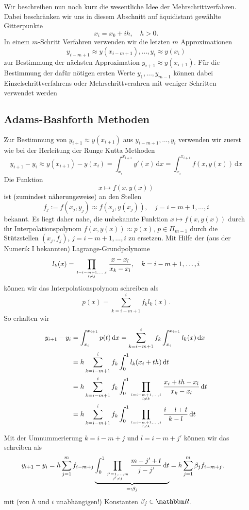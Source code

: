 \documentclass[12pt,a4paper]{book}
\theoremstyle{break}
\theoremstyle{nonumberplain}
\newcommand{\R}{\mathbbm R}
\newcommand{\1}{\mathbbm{1}} 			      	%
\newcommand{\dx}[1][x]{\ensuremath{\, \mathrm{d} #1}} 	%
\begin{document}
Wir beschreiben nun noch kurz die wesentliche Idee der Mehrschrittverfahren. 
Dabei beschränken wir uns in diesem Abschnitt auf äquidistant gewählte Gitterpunkte 
\[
x_i=x_0+ih, \quad h>0. 
\]
In einem $m$-Schritt Verfahren verwenden wir die letzten $m$ Approximationen
\[
y_{i-m+1}\approx y(x_{i-m+1}),\ldots, y_{i}\approx y(x_{i})
\]
zur Bestimmung der nächsten Approximation $y_{i+1}\approx y(x_{i+1})$.
Für die Bestimmung der dafür nötigen ersten Werte $y_1,\ldots, y_{m-1}$ 
können dabei Einzelschrittverfahrens oder Mehrschrittverahren mit weniger Schritten 
verwendet werden

\subsection{Adams-Bashforth Methoden}\label{subsect:adam_bashforth}
Zur Bestimmung von $y_{i+1}\approx y(x_{i+1})$ aus $y_{i-m+1},\ldots,y_i$ 
verwenden wir zuerst wie bei der
Herleitung der Runge Kutta Methoden
\[
y_{i+1}-y_i\approx y(x_{i+1})-y(x_i)=\int_{x_i}^{x_{i+1}} y'(x) \dx
=\int_{x_i}^{x_{i+1}} f(x,y(x)) \dx[x]
\]
Die Funktion 
\[
x\mapsto f(x,y(x))
\]
ist (zumindest näherungsweise) an den Stellen 
\[
f_j:=f(x_j,y_j)\approx f(x_j,y(x_j)), \quad j=i-m+1,\ldots,i
\]
bekannt. Es liegt daher nahe, die unbekannte Funktion $x\mapsto f(x,y(x))$ durch ihr 
Interpolationspolynom $f(x,y(x))\approx p(x)$, $p\in \Pi_{m-1}$ durch die Stützstellen $(x_j,f_j)$, $j=i-m+1,\ldots,i$ zu ersetzen. 
Mit Hilfe der (aus der Numerik I bekannten) Lagrange-Grundpo\-ly\-no\-me
\[
l_k(x)=\prod_{l=i-m+1,\dots,i \atop l\neq j} \frac{x-x_l}{x_k-x_l}, \quad k=i-m+1,\ldots,i
\]
können wir das Interpolationspolynom schreiben als
\[
p(x)=\sum_{k=i-m+1}^i f_k l_k(x).
\]
So erhalten wir
\begin{align*}
y_{i+1}-y_i&= \int_{x_{i}}^{x_{i+1}} p(t) \dx
=\sum_{k=i-m+1}^i f_k \int_{x_{i}}^{x_{i+1}} l_k(x)\dx\\
&=h \sum_{k=i-m+1}^i f_k \int_0^1 l_k(x_i+th)\dx[t]\\
&= h \sum_{k=i-m+1}^i f_k \int_0^1 \prod_{l=i-m+1,\dots,i \atop l\neq k} \frac{x_i+th - x_l}{x_k-x_l}\dx[t]\\
&= h \sum_{k=i-m+1}^i f_k \int_0^1 \prod_{l=i-m+1,\dots,i \atop l\neq k}
 \frac{i-l+t}{k-l}\dx[t]
\end{align*}
Mit der Umnummerierung $k=i-m+j$ und $l=i-m+j'$ können wir das schreiben als
\begin{align*}
y_{i+1}-y_i&= h \sum_{j=1}^m f_{i-m+j} \underbrace{\int_0^1 \prod_{j'=1,\ldots,m \atop j'\neq j}
 \frac{m-j'+t}{j-j'}\dx[t]}_{=:\beta_j}
=h\sum_{j=1}^m\beta_j f_{i-m + j},
\end{align*}
mit (von $h$ und $i$ unabhängigen!) Konstanten $\beta_j\in \R$.
\end{document}
